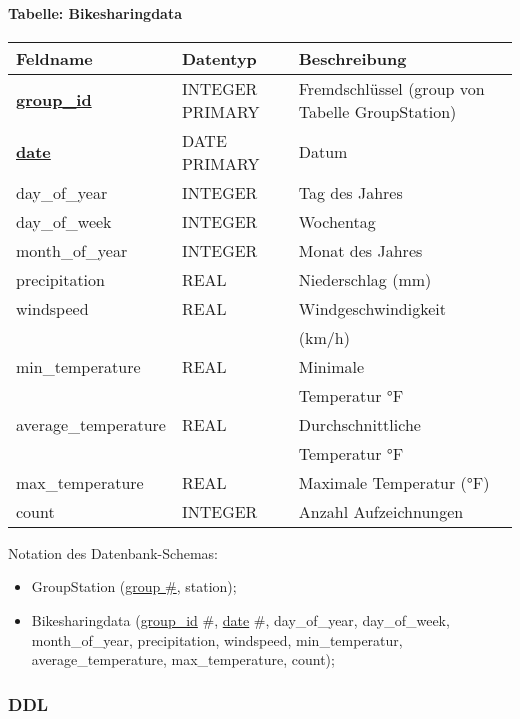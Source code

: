 \documentclass[11pt]{article}
\begin{document}
\paragraph*{Tabelle: Bikesharingdata} 
\RaggedRight
\begin{longtable}{|>{\raggedright\arraybackslash}p{3.5cm}|>{\raggedright\arraybackslash}p{3cm}|>{\raggedright\arraybackslash}p{4cm}|}
\hline 
\textbf{Feldname} & \textbf{Datentyp} & \textbf{Beschreibung} \\
\hline
\underline{\textbf{group\_id}} & INTEGER PRIMARY & Fremdschlüssel (group von Tabelle GroupStation) \\ 
\underline{\textbf{date}} & DATE PRIMARY & Datum \\ 
day\_of\_year & INTEGER & Tag des Jahres \\ 
day\_of\_week & INTEGER & Wochentag \\
month\_of\_year & INTEGER & Monat des Jahres \\ 
precipitation & REAL & Niederschlag (mm) \\ 
windspeed & REAL & Windgeschwindigkeit \\ 
    &   & (km/h) \\
min\_temperature & REAL & Minimale \\ 
    &   & Temperatur °F \\
average\_temperature & REAL & Durchschnittliche \\
    &   & Temperatur °F \\
max\_temperature & REAL & Maximale Temperatur (°F) \\ 
count & INTEGER & Anzahl Aufzeichnungen \\ 
\hline 
\end{longtable}


Notation des Datenbank-Schemas:

\begin{itemize}
    \item GroupStation (\underline{group \#}, station); \\
    \item Bikesharingdata (\underline{group\_id} \#, \underline{date} \#, day\_of\_year, day\_of\_week, month\_of\_year, precipitation, windspeed, min\_temperatur, \\ average\_temperature, max\_temperature, count);\\
\end{itemize}


\subsubsection{DDL}
\end{document}
